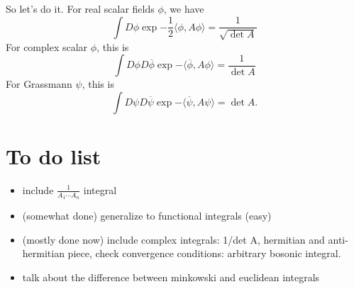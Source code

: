 \documentclass[main.tex]{subfiles}
\begin{document}
So let's do it. For real scalar fields $\phi$, we have
\[
\int D \phi \exp{-\frac{1}{2} \langle \phi, A \phi \rangle} = \frac{1}{\sqrt{\det A}}
\]
For complex scalar $\phi$, this is
\[
\int D \phi D\overline{\phi} \exp{-\langle \overline{\phi},A\phi \rangle} = \frac{1}{\det A}
\]
For Grassmann $\psi$, this is
\[
\int D \psi D \overline{\psi} \exp{-\langle \overline{\psi}, A\psi \rangle} = \det A.
\]
\section{To do list} 
\begin{itemize}
\item include $\frac{1}{A_1 \cdots A_n}$ integral
\item (somewhat done) generalize to functional integrals (easy)
\item (mostly done now) include complex integrals: 1/det A, hermitian and anti-hermitian piece, check convergence conditions: arbitrary bosonic integral.
\item talk about the difference between minkowski and euclidean integrals
\end{itemize}
\end{document}
